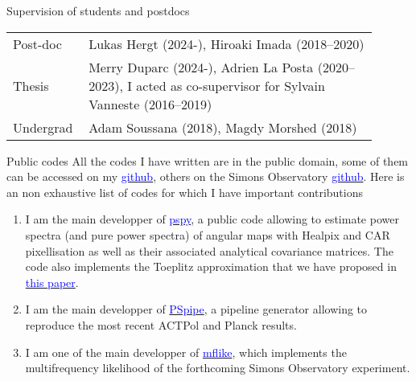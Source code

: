 \documentclass{resume} %
\newcommand{\TIB}[1]{\textcolor{blue}{#1}}
\begin{document}
\begin{rSection}{Supervision of	students and postdocs}
\vspace{-0.4cm}

\begin{table}[h]
{\def\arraystretch{1.5}\tabcolsep=0pt
\begin{tabular}{p{0.15\linewidth}p{0.75\linewidth}}
Post-doc  & Lukas Hergt (2024-), Hiroaki Imada (2018--2020) \\
Thesis  & Merry Duparc (2024-),  Adrien La Posta (2020--2023), I acted as co-supervisor for Sylvain Vanneste (2016--2019) \\
Undergrad   & Adam Soussana (2018), Magdy Morshed (2018) 
\end{tabular}%
}
\end{table}
\vspace{-0.6cm}
\end{rSection}


\begin{rSection}{Public codes}
All the codes I have written are in the public domain, some of them can be accessed on my \href{https://github.com/thibautlouis}{\TIB{github}}, others on the Simons Observatory \href{https://github.com/simonobs}{\TIB{github}}. Here is an non exhaustive list of codes for which I have important contributions 
\begin{enumerate}
\item I am the main developper of \href{https://github.com/simonsobs/pspy}{\TIB{pspy}}, a public code allowing to estimate power spectra (and pure power spectra) of angular maps with Healpix and CAR pixellisation as well as their associated analytical covariance matrices. The code also implements the Toeplitz approximation that we have proposed in \href{https://ui.adsabs.harvard.edu/abs/2020PhRvD.102l3538L/abstract}{\TIB{this paper}}.
\item I am  the main developper of \href{https://github.com/simonsobs/PSpipe}{\TIB{PSpipe}}, a pipeline generator allowing to reproduce the most recent ACTPol and Planck results. 
\item I am one of the main developper of \href{https://github.com/simonsobs/mflike}{\TIB{mflike}}, which implements the multifrequency likelihood of the forthcoming Simons Observatory experiment. 

\end{enumerate}

\end{rSection}
\end{document}
